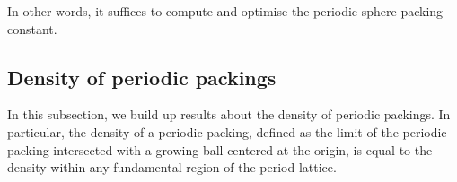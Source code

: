 In other words, it suffices to compute and optimise the periodic sphere packing constant.

\subsection{Density of periodic packings}

In this subsection, we build up results about the density of periodic packings. In particular, the density of a periodic packing, defined as the limit of the periodic packing intersected with a growing ball centered at the origin, is equal to the density within any fundamental region of the period lattice.

